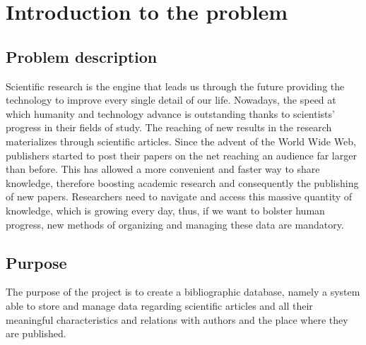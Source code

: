 \chapter{Introduction to the problem}
\label{ch:chapter_one}%


\section{Problem description}
\label{sec:section_name}%
Scientific research is the engine that leads us through the future providing the technology to improve every single detail of our life.
Nowadays, the speed at which humanity and technology advance is outstanding thanks to scientists' progress in their fields of study.
The reaching of new results in the research materializes through scientific articles.
Since the advent of the World Wide Web, publishers started to post their papers on the net reaching an audience far larger than before.
This has allowed a more convenient and faster way to share knowledge, therefore boosting academic research and consequently the publishing of new papers.
Researchers need to navigate and access this massive quantity of knowledge, which is growing every day, thus, if we want to bolster human progress, new methods of organizing and managing these data are mandatory.


\section{Purpose}
\label{sec:purpose}%
The purpose of the project is to create a bibliographic database, namely a system able to store and manage data regarding scientific articles and all their meaningful characteristics and relations with authors and the place where they are published.


